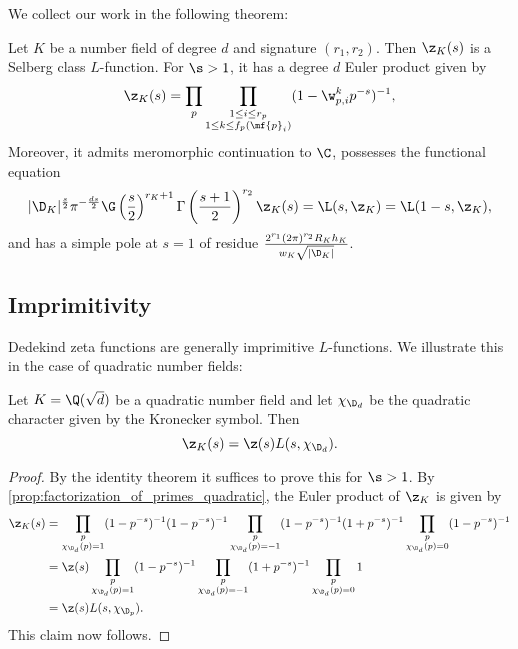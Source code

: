       We collect our work in the following theorem:

      \begin{theorem}\label{thm:Dedekind_Selberg}
        Let $K$ be a number field of degree $d$ and signature $(r_{1},r_{2})$. Then $\z_{K}(s)$ is a Selberg class $L$-function. For $\s > 1$, it has a degree $d$ Euler product given by
        \[
          \z_{K}(s) = \prod_{p}\prod_{\substack{1 \le i \le r_{p} \\ 1 \le k \le f_{p}(\mf{p}_{i})}}(1-\w_{p,i}^{k}p^{-s})^{-1},
        \]
        Moreover, it admits meromorphic continuation to $\C$, possesses the functional equation
        \[
          |\D_{K}|^{\frac{s}{2}}\pi^{-\frac{ds}{2}}\G\left(\frac{s}{2}\right)^{r_{K}+1}\Gamma\left(\frac{s+1}{2}\right)^{r_{2}}\z_{K}(s) = \L(s,\z_{K}) = \L(1-s,\z_{K}),
        \]
        and has a simple pole at $s = 1$ of residue $\frac{2^{r_{1}}(2\pi)^{r_{2}}R_{K}h_{K}}{w_{K}\sqrt{|\D_{K}|}}$.
      \end{theorem}
    \subsection*{Imprimitivity}
      Dedekind zeta functions are generally imprimitive $L$-functions. We illustrate this in the case of quadratic number fields:

      \begin{theorem}
        Let $K = \Q(\sqrt{d})$ be a quadratic number field and let $\chi_{\D_{d}}$ be the quadratic character given by the Kronecker symbol. Then
        \[
          \z_{K}(s) = \z(s)L(s,\chi_{\D_{d}}).
        \]
      \end{theorem}
      \begin{proof}
        By the identity theorem it suffices to prove this for $\s > 1$. By \cref{prop:factorization_of_primes_quadratic}, the Euler product of $\z_{K}$ is given by
        \begin{align*}
          \z_{K}(s) &= \prod_{\substack{p \\ \chi_{\D_{d}}(p) = 1}}(1-p^{-s})^{-1}(1-p^{-s})^{-1}\prod_{\substack{p \\ \chi_{\D_{d}}(p) = -1}}(1-p^{-s})^{-1}(1+p^{-s})^{-1}\prod_{\substack{p \\ \chi_{\D_{d}}(p) = 0}}(1-p^{-s})^{-1} \\
          &= \z(s)\prod_{\substack{p \\ \chi_{\D_{d}}(p) = 1}}(1-p^{-s})^{-1}\prod_{\substack{p \\ \chi_{\D_{d}}(p) = -1}}(1+p^{-s})^{-1}\prod_{\substack{p \\ \chi_{\D_{d}}(p) = 0}}1 \\
          &= \z(s)L(s,\chi_{\D_{p}}).
        \end{align*}
        This claim now follows.
      \end{proof}
